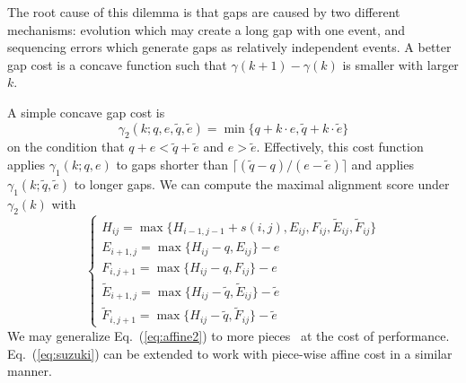 \documentclass{bioinfo}
\begin{document}
The root cause of this dilemma is that gaps are caused by two different
mechanisms: evolution which may create a long gap with one event, and
sequencing errors which generate gaps as relatively independent events. A
better gap cost is a concave function such that $\gamma(k+1)-\gamma(k)$ is
smaller with larger $k$.

A simple concave gap cost is
\[
\gamma_2(k;q,e,\tilde{q},\tilde{e})=\min\{q+k\cdot e,\tilde{q}+k\cdot\tilde{e}\}
\]
on the condition that $q+e<\tilde{q}+\tilde{e}$ and $e>\tilde{e}$. Effectively,
this cost function applies $\gamma_1(k;q,e)$ to gaps shorter than
$\lceil(\tilde{q}-q)/(e-\tilde{e})\rceil$ and applies
$\gamma_1(k;\tilde{q},\tilde{e})$ to longer gaps. We can compute the maximal
alignment score under $\gamma_2(k)$ with
\begin{equation}\label{eq:affine2}
\left\{\begin{array}{l}
H_{ij} = \max\{H_{i-1,j-1}+s(i,j),E_{ij},F_{ij},\tilde{E}_{ij},\tilde{F}_{ij}\}\\
E_{i+1,j}= \max\{H_{ij}-q,E_{ij}\}-e\\
F_{i,j+1}= \max\{H_{ij}-q,F_{ij}\}-e\\
\tilde{E}_{i+1,j}= \max\{H_{ij}-\tilde{q},\tilde{E}_{ij}\}-\tilde{e}\\
\tilde{F}_{i,j+1}= \max\{H_{ij}-\tilde{q},\tilde{F}_{ij}\}-\tilde{e}
\end{array}\right.
\end{equation}
We may generalize Eq.~(\ref{eq:affine2}) to more pieces~\citep{Gotoh:1990aa} at the
cost of performance. Eq.~(\ref{eq:suzuki}) can be extended to work with
piece-wise affine cost in a similar manner.


\end{document}
